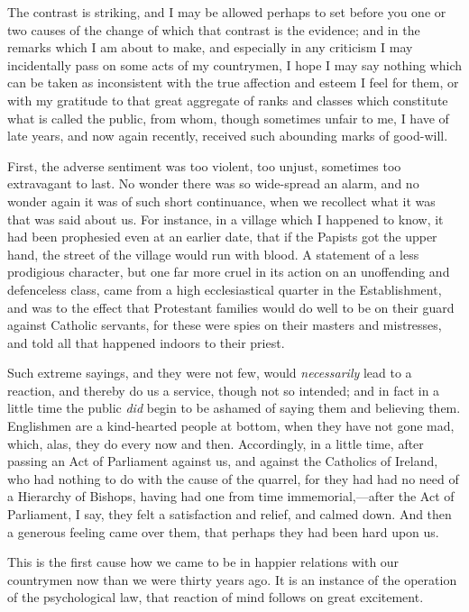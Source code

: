 The contrast is striking, and I may be allowed perhaps to set
before you one or two causes of the change of which that contrast is
the evidence; and in the remarks which I am about to make, and
especially in any criticism I may incidentally pass on some acts of my
countrymen, I hope I may say nothing which can be taken as
inconsistent with the true affection and esteem I feel for them, or
with my gratitude to that great aggregate of ranks and classes which
constitute what is called the public, from whom, though sometimes
unfair to me, I have of late years, and now again recently, received
such abounding marks of good-will.

First, the adverse sentiment was too violent, too unjust, sometimes
too extravagant to last. No wonder there was so wide-spread an alarm,
and no wonder again it was of such short continuance, when we
recollect what it was that was said about us. For instance, in a
village which I happened to know, it had been prophesied even at an
earlier date, that if the Papists got the upper hand, the street of
the village would run with blood. A statement of a less
prodigious character, but one far more cruel in its action on an
unoffending and defenceless class, came from a high ecclesiastical
quarter in the Establishment, and was to the effect that Protestant
families would do well to be on their guard against Catholic servants,
for these were spies on their masters and mistresses, and told all
that happened indoors to their priest.

Such extreme sayings, and they were not few, would \emph{necessarily}
lead to a reaction, and thereby do us a service, though not so
intended; and in fact in a little time the public \emph{did} begin to
be ashamed of saying them and believing them. Englishmen are a
kind-hearted people at bottom, when they have not gone mad, which,
alas, they do every now and then. Accordingly, in a little time, after
passing an Act of Parliament against us, and against the Catholics of
Ireland, who had nothing to do with the cause of the quarrel, for they
had had no need of a Hierarchy of Bishops, having had one from time
immemorial,—after the Act of Parliament, I say, they felt a
satisfaction and relief, and calmed down. And then a generous feeling
came over them, that perhaps they had been hard upon us.

This is the first cause how we came to be in happier relations with
our countrymen now than we were thirty years ago. It is an instance of
the operation of the psychological law, that reaction of mind follows
on great excitement.

